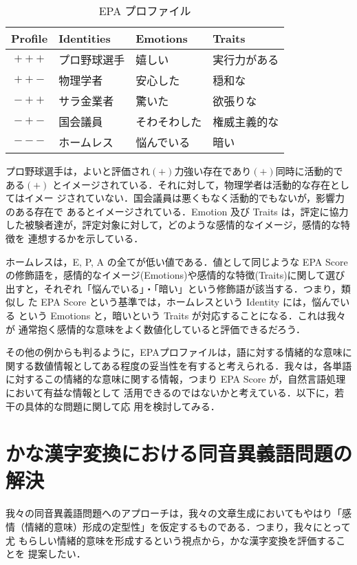 \documentclass[japanese]{jnlp_1.3d}
\begin{document}
\begin{table}[b]
 \caption{EPA プロファイル} \label{table:EPA_Profile}
 \begin{center}
  \begin{tabular}{clll} \hline
   Profile & Identities & Emotions & Traits  \\ \hline
   ${+++}$ & プロ野球選手 & 嬉しい   & 実行力がある \\ 
   ${++-}$ & 物理学者     & 安心した & 穏和な \\  
   ${-++}$ & サラ金業者 & 驚いた & 欲張りな\\ 
   ${-+-}$ & 国会議員 & そわそわした & 権威主義的な\\ 
   ${---}$ & ホームレス & 悩んでいる & 暗い \\ \hline
  \end{tabular}
 \end{center}
\end{table}

プロ野球選手は，よいと評価され$(+)$力強い存在であり$(+)$同時に活動的である$(+)$
とイメージされている．それに対して，物理学者は活動的な存在としてはイメー
ジされていない．国会議員は悪くもなく活動的でもないが，影響力のある存在で
あるとイメージされている．Emotion 及び Traits は，評定に協力した被験者達が，評定対象に対して，どのような感情的なイメージ，感情的な特徴を
連想するかを示している．

ホームレスは，E, P, A の全てが低い値である．値として同じような EPA Score
の修飾語を，感情的なイメージ(Emotions)や感情的な特徴(Traits)に関して選び
出すと，それぞれ「悩んでいる」・「暗い」という修飾語が該当する．つまり，類似し
た EPA Score という基準では，ホームレスという Identity には，悩んでいる
という Emotions と，暗いという Traits が対応することになる．これは我々が
通常抱く感情的な意味をよく数値化していると評価できるだろう．

その他の例からも判るように，EPAプロファイルは，語に対する情緒的な意味に関する数値情報としてある程度の妥当性を有すると考えられる．我々は，各単語に対するこの情緒的な意味に関する情報，つまり EPA Score が，自然言語処理において有益な情報として
活用できるのではないかと考えている．以下に，若干の具体的な問題に関して応
用を検討してみる．



\section{かな漢字変換における同音異義語問題の解決}
我々の同音異義語問題へのアプローチは，我々の文章生成においてもやはり「感
情（情緒的意味）形成の定型性」を仮定するものである．つまり，我々にとって尤
もらしい情緒的意味を形成するという視点から，かな漢字変換を評価することを
提案したい．
\end{document}
